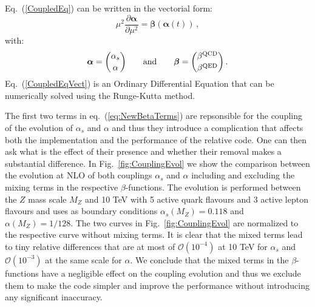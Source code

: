 \begin{widetext}
Eq.~(\ref{CoupledEq}) can be written in the vectorial form:
\begin{equation}\label{CoupledEqVect}
\mu^2\frac{\partial {\bm \alpha}}{\partial \mu^2} = {\bm \beta}\left({\bm \alpha}(t)\right)\,,
\end{equation}
with:
\begin{equation}
  {\bm \alpha} = {\alpha_s \choose \alpha}\qquad\mbox{and}\qquad  {\bm \beta} = {\beta^{\rm QCD} \choose \beta^{\rm QED}}\,.
\end{equation}
Eq.~(\ref{CoupledEqVect}) is an Ordinary Differential Equation that
can be numerically solved using the Runge-Kutta method.

The first two terms in eq.~(\ref{eq:NewBetaTerms}) are repsonsible for
the coupling of the evolution of $\alpha_s$ and $\alpha$ and thus they
introduce a complication that affects both the implementation and the
performance of the relative code. One can then ask what is the effect
of their presence and whether their removal makes a substantial
difference. In Fig.~\ref{fig:CouplingEvol} we show the comparison
between the evolution at NLO of both couplings $\alpha_s$ and $\alpha$
including and excluding the mixing terms in the respective
$\beta$-functions. The evolution is performed between the $Z$ mass
scale $M_Z$ and 10 TeV with 5 active quark flavours and 3 active
lepton flavours and uses as boundary conditions
$\alpha_s(M_Z) = 0.118$ and $\alpha(M_Z) = 1/128$. The two curves in
Fig.~\ref{fig:CouplingEvol} are normalized to the respective curve
without mixing terms. It is clear that the mixed terms lead to tiny
relative differences that are at most of $\mathcal{O}(10^{-4})$ at 10
TeV for $\alpha_s$ and $\mathcal{O}(10^{-3})$ at the same scale for
$\alpha$. We conclude that the mixed terms in the $\beta$-functions
have a negligible effect on the coupling evolution and thus we exclude
them to make the code simpler and improve the performance without
introducing any significant inaccuracy.


\end{widetext}
